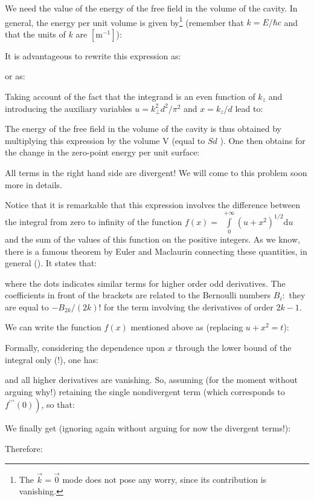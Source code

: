 	We need the value of the energy of the free field in the volume of the cavity. In general, the energy per unit volume is given by\footnote{The $\vec{k}=\vec{0}$ mode does not pose any worry, since its contribution is vanishing.} (remember that $k=E/\hbar c$ and that the units of $k$ are $[\text{m}^{-1}]$):
	
	It is advantageous to rewrite this expression as:
	
	or as:
	
	Taking account of the fact that the integrand is an even function of $k_{z}$ and introducing the auxiliary variables $u=k_{\perp}^{2} d^{2} / \pi^{2}$ and $x=k_{z} / d$ lead to:
	
	The energy of the free field in the volume of the cavity is thus obtained by multiplying this expression by the volume $\mathrm{V}$ (equal to $S d$ ). One then obtains for the change in the zero-point energy per unit surface:
	
	All terms in the right hand side are divergent! We will come to this problem soon more in details. 
	
	Notice that it is remarkable that this expression involves the difference between the integral from zero to infinity of the function $f(x)=$ $\int\limits_{0}^{+\infty}\left(u+x^{2}\right)^{1 / 2}\mathrm{d}u$ and the sum of the values of this function on the positive integers. As we know, there is a famous theorem by Euler and Maclaurin connecting these quantities, in general (). It states that:
	
	where the dots indicates similar terms for higher order odd derivatives. The coefficients in front of the brackets are related to the Bernoulli numbers $B_{i}:$ they are equal to $-B_{2 k} /(2 k) !$ for the term involving the derivatives of order $2 k-1$.
	
	We can write the function $f(x)$ mentioned above as (replacing $u+x^2=t$):
	
	Formally, considering the dependence upon $x$ through the lower bound of the integral only (!), one has:
	
	and all higher derivatives are vanishing. So, assuming (for the moment without arguing why!) retaining the single nondivergent term (which corresponds to $\left.f^{\prime \prime \prime}(0)\right)$, so that:
	
	We finally get (ignoring again without arguing for now the divergent terms!):
	
	Therefore:
	
